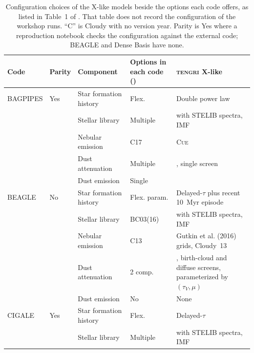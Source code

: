\begin{table}[!t]
\centering
\caption{Configuration choices of the X-like models beside the options each code offers, as listed in Table~1 of \citet{Pacifici_2023}. That table does not record the configuration of the workshop runs. ``C'' is Cloudy with no version year. Parity is Yes where a reproduction notebook checks the configuration against the external code; BEAGLE and Dense Basis have none.}
\label{tab:xlike_choices}
\scriptsize
\setlength{\tabcolsep}{4pt}
\begin{tabular}{@{}lllll@{}}
\toprule
Code & Parity & Component & \parbox[t]{3.4cm}{\raggedright Options in each code (\citealp[Table~1]{Pacifici_2023})} & \textsc{tengri} X-like \\
\midrule
BAGPIPES & Yes & Star formation history & Flex. & \parbox[t]{5.4cm}{\raggedright Double power law} \\
 &  & Stellar library & Multiple & \parbox[t]{5.4cm}{\raggedright \citet{Bruzual_2003} with STELIB spectra, \citet{Chabrier_2003} IMF} \\
 &  & Nebular emission & C17 & \parbox[t]{5.4cm}{\raggedright \textsc{Cue} \citep{Li_2025}} \\
 &  & Dust attenuation & Multiple & \parbox[t]{5.4cm}{\raggedright \citet{Calzetti_2000}, single screen} \\
 &  & Dust emission & Single & \parbox[t]{5.4cm}{\raggedright \citet{Draine_2007}} \\
\midrule
BEAGLE & No & Star formation history & Flex. param. & \parbox[t]{5.4cm}{\raggedright Delayed-$\tau$ plus recent 10~Myr episode} \\
 &  & Stellar library & BC03(16) & \parbox[t]{5.4cm}{\raggedright \citet{Bruzual_2003} with STELIB spectra, \citet{Chabrier_2003} IMF} \\
 &  & Nebular emission & C13 & \parbox[t]{5.4cm}{\raggedright Gutkin et al. (2016) grids, Cloudy~13} \\
 &  & Dust attenuation & 2 comp. & \parbox[t]{5.4cm}{\raggedright \citet{Charlot_2000}, birth-cloud and diffuse screens, parameterized by $(\tau_V, \mu)$} \\
 &  & Dust emission & No & \parbox[t]{5.4cm}{\raggedright None} \\
\midrule
CIGALE & Yes & Star formation history & Flex. & \parbox[t]{5.4cm}{\raggedright Delayed-$\tau$} \\
 &  & Stellar library & Multiple & \parbox[t]{5.4cm}{\raggedright \citet{Bruzual_2003} with STELIB spectra, \citet{Chabrier_2003} IMF} \\

\end{tabular}
\end{table}
